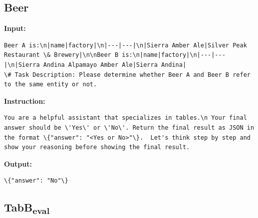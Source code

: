 \documentclass[11pt]{article}
\begin{document}
\subsection{Beer}
\textbf{Input:}
\begin{lstlisting}
Beer A is:\n|name|factory|\n|---|---|\n|Sierra Amber Ale|Silver Peak Restaurant \& Brewery|\n\nBeer B is:\n|name|factory|\n|---|---|\n|Sierra Andina Alpamayo Amber Ale|Sierra Andina|    
\# Task Description: Please determine whether Beer A and Beer B refer to the same entity or not.
\end{lstlisting}
\textbf{Instruction:}
\begin{lstlisting}
You are a helpful assistant that specializes in tables.\n Your final answer should be \'Yes\' or \'No\'. Return the final result as JSON in the format \{"answer": "<Yes or No>"\}.  Let's think step by step and show your reasoning before showing the final result.
\end{lstlisting}
\textbf{Output:}
\begin{lstlisting}
\{"answer": "No"\}
\end{lstlisting}

\subsection{TabB\textsubscript{eval}}
\end{document}
